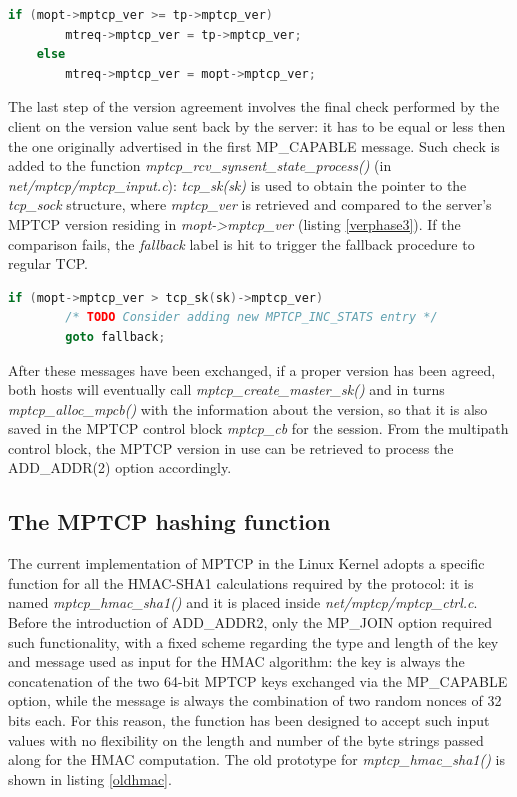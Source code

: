 \begin{lstlisting}[language=c, caption=\textit{MPTCP version agreement, phase 2}, label=verphase2]
	if (mopt->mptcp_ver >= tp->mptcp_ver)
		mtreq->mptcp_ver = tp->mptcp_ver;
	else
		mtreq->mptcp_ver = mopt->mptcp_ver;
\end{lstlisting}

The last step of the version agreement involves the final check performed by the client on the version value sent back by the server: it has to be equal or less then the one originally advertised in the first MP\_CAPABLE message. Such check is added to the function \textit{mptcp\_rcv\_synsent\_state\_process()} (in \textit{net/mptcp/mptcp\_input.c}): \textit{tcp\_sk(sk)} is used to obtain the pointer to the \textit{tcp\_sock} structure, where \textit{mptcp\_ver} is retrieved and compared to the server's MPTCP version residing in \textit{mopt->mptcp\_ver} (listing \ref{verphase3}). If the comparison fails, the \textit{fallback} label is hit to trigger the fallback procedure to regular TCP.

\begin{lstlisting}[language=c, caption=\textit{MPTCP version agreement, phase 3}, label=verphase3]
	if (mopt->mptcp_ver > tcp_sk(sk)->mptcp_ver)
		/* TODO Consider adding new MPTCP_INC_STATS entry */
		goto fallback;
\end{lstlisting}

After these messages have been exchanged, if a proper version has been agreed, both hosts will eventually call \textit{mptcp\_create\_master\_sk()} and in turns \textit{mptcp\_alloc\_mpcb()} with the information about the version, so that it is also saved in the MPTCP control block \textit{mptcp\_cb} for the session. From the multipath control block, the MPTCP version in use can be retrieved to process the ADD\_ADDR(2) option accordingly.

\subsection{The MPTCP hashing function}
\label{newhash}
The current implementation of MPTCP in the Linux Kernel adopts a specific function for all the HMAC-SHA1 calculations required by the protocol: it is named \textit{mptcp\_hmac\_sha1()} and it is placed inside \textit{net/mptcp/mptcp\_ctrl.c}. Before the introduction of ADD\_ADDR2, only the MP\_JOIN option required such functionality, with a fixed scheme regarding the type and length of the key and message used as input for the HMAC algorithm: the key is always the concatenation of the two 64-bit MPTCP keys exchanged via the MP\_CAPABLE option, while the message is always the combination of two random nonces of 32 bits each. For this reason, the function has been designed to accept such input values with no flexibility on the length and number of the byte strings passed along for the HMAC computation. The old prototype for \textit{mptcp\_hmac\_sha1()} is shown in listing \ref{oldhmac}.


